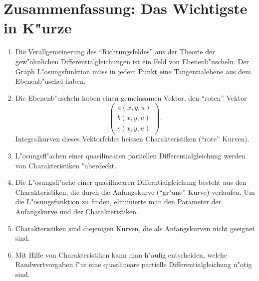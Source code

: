 \section{Zusammenfassung: Das Wichtigste in K"urze}
\begin{enumerate}
\item Die Verallgemeinerung des ``Richtungsfeldes'' aus der Theorie der
gew"ohnlichen Differentialgleichungen ist ein Feld von Ebenenb"uscheln.
Der Graph L"osungsfunktion muss in jedem Punkt eine Tangentialebene aus
dem Ebenenb"uschel haben.
\item Die Ebenenb"uscheln haben einen gemeinsamen Vektor, den ``roten''
Vektor
\[
\begin{pmatrix}
a(x,y,u)\\
b(x,y,u)\\
c(x,y,u)
\end{pmatrix}.
\]
Integralkurven dieses Vektorfeldes heissen Charakteristiken (``rote'' Kurven).
\item L"osungsfl"achen einer quasilinearen partiellen Differentialgleichung
werden von Charakteristiken "uberdeckt.
\item Die L"osungsfl"ache einer quasilinearen Differntialgleichung besteht aus
den Charakteristiken, die durch die Anfangskurve
(``gr"une'' Kurve) verlaufen.
Um die L"osungsfunktion zu finden, eliminierte man den Parameter der
Anfangskurve und der Charakteristiken.
\item Charakteristiken sind diejenigen Kurven, die als Anfangskurven
nicht geeignet sind.
\item Mit Hilfe von Charakteristiken kann man h"aufig entscheiden,
welche Randwertvorgaben f"ur eine quasilineare partielle Differentialgleichung
n"otig sind.
\end{enumerate}

